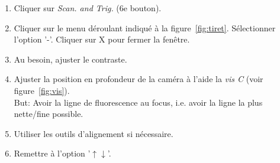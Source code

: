 \begin{enumerate}
    \item Cliquer sur \textit{Scan. and Trig.} (6e bouton).
    \item Cliquer sur le menu déroulant indiqué à la figure~\ref{fig:tiret}. Sélectionner l'option '-'. Cliquer sur X pour fermer la fenêtre.
    \item Au besoin, ajuster le contraste.
   \item Ajuster la position en profondeur de la caméra à l'aide la \textit{vis C} (voir figure~\ref{fig:vis}).
    \\ But: Avoir la ligne de fluorescence au focus, i.e. avoir la ligne la plus nette/fine possible.
    \item Utiliser les outils d'alignement si nécessaire.
    \item Remettre à l'option '$\uparrow\downarrow$'.
\end{enumerate}
